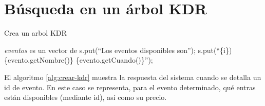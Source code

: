 
\section{Búsqueda en un árbol KDR}
\begin{algorithm}
\caption{Crea un arbol KDR}
\label{alg:crear-kdr}
\begin{algorithmic}[1]
	\Require \emph{eventos} es un vector de 
\State s.put(``Los eventos disponibles son'');
	\State s.put(``\{i\}) \{evento.getNombre()\} \{evento.getCuando()\}'');
\EndFor
\EndProcedure
\end{algorithmic}
\end{algorithm}

El algoritmo \ref{alg:crear-kdr} muestra la respuesta del sistema cuando se detalla un id de evento.
En este caso se representa, para el evento determinado, qué entras están disponibles (mediante id),
    así como su precio.